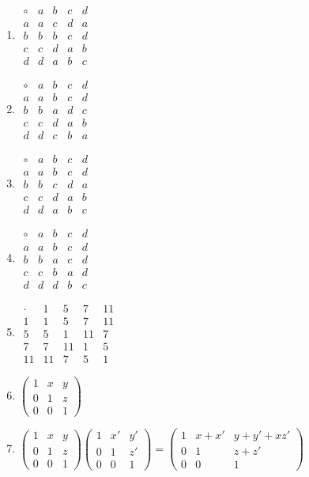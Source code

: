 \documentclass[oneside,10pt,]{article}
\begin{document}
\begin{enumerate}
\item{}\(\displaystyle \begin{array}{c|cccc} \circ & a & b & c & d \\ \hline a & a & c & d & a \\ b & b & b & c & d \\ c & c & d & a & b \\ d & d & a & b & c \end{array}\)%
\item{}\(\displaystyle \begin{array}{c|cccc} \circ & a & b & c & d \\ \hline a & a & b & c & d \\ b & b & a & d & c \\ c & c & d & a & b \\ d & d & c & b & a \end{array}\)%
\item{}\(\displaystyle \begin{array}{c|cccc} \circ & a & b & c & d \\ \hline a & a & b & c & d \\ b & b & c & d & a \\ c & c & d & a & b \\ d & d & a & b & c \end{array}\)%
\item{}\(\displaystyle \begin{array}{c|cccc} \circ & a & b & c & d \\ \hline a & a & b & c & d \\ b & b & a & c & d \\ c & c & b & a & d \\ d & d & d & b & c \end{array}\)%
\item{}\(\displaystyle \begin{array}{c|cccc} \cdot & 1 & 5 & 7 & 11 \\ \hline 1 & 1 & 5 & 7 & 11 \\ 5 & 5 & 1 & 11 & 7 \\ 7 & 7 & 11 & 1 & 5 \\ 11 & 11 & 7 & 5 & 1 \end{array}\)%
\item{}\(\displaystyle \begin{pmatrix} 1 & x & y \\ 0 & 1 & z \\ 0 & 0 & 1 \end{pmatrix}\)%
\item{}\(\displaystyle \begin{pmatrix} 1 & x & y \\ 0 & 1 & z \\ 0 & 0 & 1 \end{pmatrix} \begin{pmatrix} 1 & x' & y' \\ 0 & 1 & z' \\ 0 & 0 & 1 \end{pmatrix} = \begin{pmatrix} 1 & x+x' & y+y'+xz' \\ 0 & 1 & z+z' \\ 0 & 0 & 1 \end{pmatrix}\)%

\end{enumerate}
\end{document}
